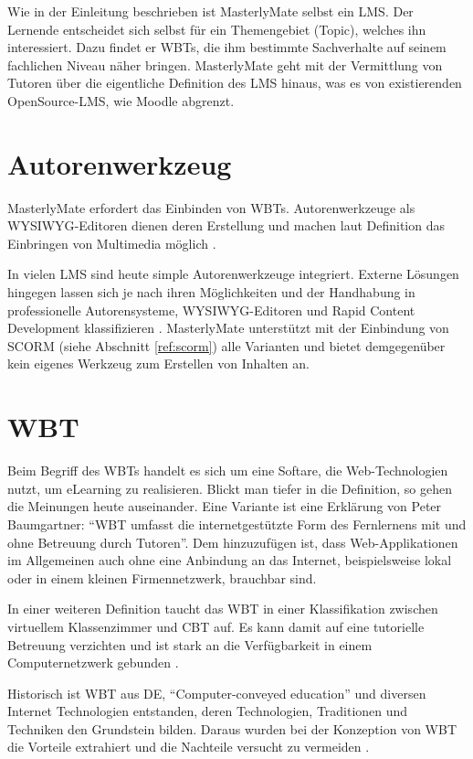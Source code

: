 Wie in der Einleitung beschrieben ist MasterlyMate selbst ein LMS. Der Lernende
entscheidet sich selbst für ein Themengebiet (Topic), welches ihn interessiert.
Dazu findet er WBTs, die ihm bestimmte Sachverhalte auf seinem fachlichen Niveau
näher bringen. MasterlyMate geht mit der Vermittlung von Tutoren über die
eigentliche Definition des LMS hinaus, was es von existierenden OpenSource-LMS,
wie Moodle abgrenzt.

\section{Autorenwerkzeug}
MasterlyMate erfordert das Einbinden von WBTs. Autorenwerkzeuge als
\ac{WYSIWYG}-Editoren dienen deren Erstellung und machen laut Definition das
Einbringen von Multimedia möglich \cite{niegemann:2004}. 

In vielen LMS sind heute simple Autorenwerkzeuge integriert. Externe Lösungen
hingegen lassen sich je nach ihren Möglichkeiten und der Handhabung in
professionelle Autorensysteme, WYSIWYG-Editoren und Rapid Content Development
klassifizieren \cite{niegemann:2004}. MasterlyMate unterstützt mit der
Einbindung von SCORM (siehe Abschnitt \ref{ref:scorm}) alle Varianten und bietet
demgegenüber kein eigenes Werkzeug zum Erstellen von Inhalten an.

\section{WBT}
Beim Begriff des WBTs handelt es sich um eine Softare, die Web-Technologien
nutzt, um eLearning zu realisieren. Blickt man tiefer in die Definition, so
gehen die Meinungen heute auseinander. Eine Variante ist eine Erklärung von
Peter Baumgartner: "`WBT umfasst die internetgestützte Form des Fernlernens mit
und ohne Betreuung durch Tutoren"'\cite{baumgartner:2002}. Dem hinzuzufügen ist,
dass Web-Applikationen im Allgemeinen auch ohne eine Anbindung an das Internet,
beispielsweise lokal oder in einem kleinen Firmennetzwerk, brauchbar sind. 

In einer weiteren Definition taucht das WBT in einer Klassifikation zwischen
virtuellem Klassenzimmer und \ac{CBT} auf. Es kann damit auf eine tutorielle
Betreuung verzichten und ist stark an die Verfügbarkeit in einem
Computernetzwerk gebunden \cite{schleifer:2003}.

Historisch ist WBT aus \ac{DE}, "`Computer-conveyed education"' und diversen
Internet Technologien entstanden, deren Technologien, Traditionen und Techniken
den Grundstein bilden. Daraus wurden bei der Konzeption von WBT die Vorteile
extrahiert und die Nachteile versucht zu vermeiden \cite{horton:2000}.

